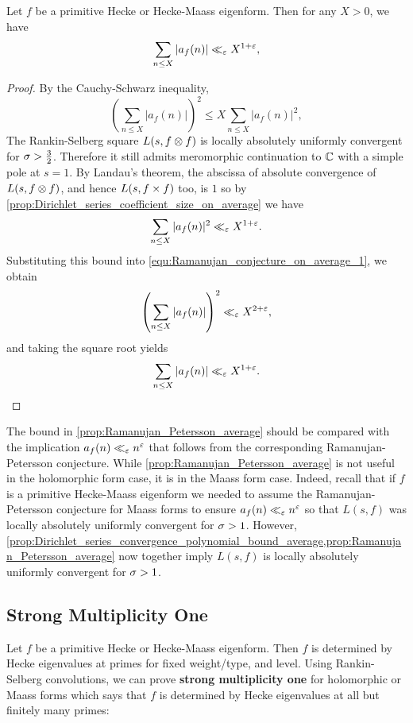       \begin{proposition}\label{prop:Ramanujan_Petersson_average}
        Let $f$ be a primitive Hecke or Hecke-Maass eigenform. Then for any $X > 0$, we have
        \[
        \sum_{n \le X}|a_{f}(n)| \ll_{\varepsilon} X^{1+\varepsilon},
        \]
      \end{proposition}
      \begin{proof}
        By the Cauchy-Schwarz inequality,
        \begin{equation}\label{equ:Ramanujan_conjecture_on_average_1}
          \left(\sum_{n \le X}|a_{f}(n)|\right)^{2} \le X\sum_{n \le X}|a_{f}(n)|^{2},
        \end{equation}
        The Rankin-Selberg square $L(s,f \otimes f)$ is locally absolutely uniformly convergent for $\sigma > \frac{3}{2}$. Therefore it still admits meromorphic continuation to $\mathbb{C}$ with a simple pole at $s = 1$. By Landau's theorem, the abscissa of absolute convergence of $L(s,f \otimes f)$, and hence $L(s,f \times f)$ too, is $1$ so by \cref{prop:Dirichlet_series_coefficient_size_on_average} we have
        \[
          \sum_{n \le X}|a_{f}(n)|^{2} \ll_{\varepsilon} X^{1+\varepsilon}.
        \]
        Substituting this bound into \cref{equ:Ramanujan_conjecture_on_average_1}, we obtain
        \[
          \left(\sum_{n \le X}|a_{f}(n)|\right)^{2} \ll_{\varepsilon} X^{2+\varepsilon},
        \]
        and taking the square root yields
        \[
          \sum_{n \le X}|a_{f}(n)| \ll_{\varepsilon} X^{1+\varepsilon}.
        \]
      \end{proof}
      
      The bound in \cref{prop:Ramanujan_Petersson_average} should be compared with the implication $a_{f}(n) \ll_{\varepsilon} n^{\varepsilon}$ that follows from the corresponding Ramanujan-Petersson conjecture. While \cref{prop:Ramanujan_Petersson_average} is not useful in the holomorphic form case, it is in the Maass form case. Indeed, recall that if $f$ is a primitive Hecke-Maass eigenform we needed to assume the Ramanujan-Petersson conjecture for Maass forms to ensure $a_{f}(n) \ll_{\varepsilon} n^{\varepsilon}$ so that $L(s,f)$ was locally absolutely uniformly convergent for $\sigma > 1$. However, \cref{prop:Dirichlet_series_convergence_polynomial_bound_average,prop:Ramanujan_Petersson_average} now together imply $L(s,f)$ is locally absolutely uniformly convergent for $\sigma > 1$.
    \subsection*{Strong Multiplicity One}
      Let $f$ be a primitive Hecke or Hecke-Maass eigenform. Then $f$ is determined by Hecke eigenvalues at primes for fixed weight/type, and level. Using Rankin-Selberg convolutions, we can prove \textbf{strong multiplicity one} for holomorphic or Maass forms which says that $f$ is determined by Hecke eigenvalues at all but finitely many primes:

